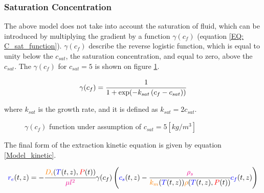 \documentclass[../Article_Model_Parameters.tex]{subfiles}
\begin{document}
	
	\subsubsection{Saturation Concentration}
	
	The above model does not take into account the saturation of fluid, which can be introduced by multiplying the gradient by a function $\gamma(c_f)$ (equation \ref{EQ: C_sat_function}). $\gamma(c_f)$ describe the reverse logistic function, which is equal to unity below the $c_{sat}$, the saturation concentration, and equal to zero, above the $c_{sat}$. The $\gamma(c_f)$ for $c_{sat}=5$ is shown on figure \ref{fig: Gamma_function}.
			
	{\footnotesize
		\begin{equation}
			\gamma(c_f) = \cfrac{1}{1+\exp ( -k_{sat} \left( c_f - c_{sat} \right) ) }
			\label{EQ: C_sat_function}
			\end{equation}
	}
			
	where $k_{sat}$ is the growth rate, and it is defined as $k_{sat} = 2c_{sat}$.
			
	\begin{figure}[h!]
		\centering
			\caption{$\gamma(c_f)$ function under assumption of $c_{sat}=5 [kg/m^3]$}
			\label{fig: Gamma_function}
	\end{figure}
			
			
	The final form of the extraction kinetic equation is given by equation \ref{Model_kinetic}.
			
	{\footnotesize
		\begin{equation}
			\label{Model_kinetic}
				{\color{blue}r_e}(t,z) = -\cfrac{{\color{orange}D_i}({\color{blue}T}(t,z), {\color{red}P}(t))}{{\color{magenta} \mu l^2} } \gamma(c_f) \left({\color{blue}c_s}(t,z) - \cfrac{{\color{magenta}\rho_s}}{{\color{orange}k_m}({\color{blue}T}(t,z)){\color{orange}\rho}({\color{blue}T}(t,z),{\color{red}P}(t))}  {\color{blue}c_f}(t,z) \right)
		\end{equation} }
			
\end{document}
